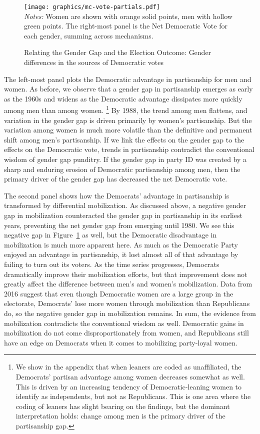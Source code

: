 \documentclass[12pt
               ,final
               ]{article}
\newcommand{\notes}[1]{\\
\small
\emph{Notes:} #1}
\begin{document}
  \begin{figure}
   \centering
   \caption{Relating the Gender Gap and the Election Outcome: Gender differences in the sources of Democratic votes}
   \label{fig:partials-on-vote}
   \texttt{[image: graphics/mc-vote-partials.pdf]}
   \notes{Women are shown with orange solid points, men with hollow green points.  The right-most panel is the Net Democratic Vote for each gender, summing across mechanisms.}
  \end{figure}

The left-most panel plots the Democratic advantage in partisanship for men and women. As before, we observe that a gender gap in partisanship emerges as early as the 1960s and widens as the Democratic advantage dissipates more quickly among men than among women.%
  \footnote{We show in the appendix that when leaners are coded as unaffiliated, the Democrats' partisan advantage among women decreases somewhat as well. This is driven by an increasing tendency of Democratic-leaning women to identify as independents, but not as Republicans. This is one area where the coding of leaners has slight bearing on the findings, but the dominant interpretation holds: change among men is the primary driver of the partisanship gap.}
By 1988, the trend among men flattens, and variation in the gender gap is driven primarily by women's partisanship. But the variation among women is much more volatile than the definitive and permanent shift among men's partisanship. If we link the effects on the gender gap to the effects on the Democratic vote, trends in partisanship contradict the conventional wisdom of gender gap punditry. If the gender gap in party ID was created by a sharp and enduring erosion of Democratic partisanship among men, then the primary driver of the gender gap has decreased the net Democratic vote.

The second panel shows how the Democrats' advantage in partisanship is transformed by differential mobilization. As discussed above, a negative gender gap in mobilization counteracted the gender gap in partisanship in its earliest years, preventing the net gender gap from emerging until 1980. We see this negative gap in Figure~\ref{fig:partials-on-vote} as well, but the Democratic disadvantage in mobilization is much more apparent here. As much as the Democratic Party enjoyed an advantage in partisanship, it lost almost all of that advantage by failing to turn out its voters. As the time series progresses, Democrats dramatically improve their mobilization efforts, but that improvement does not greatly affect the difference between men's and women's mobilization. Data from 2016 suggest that even though Democratic women are a large group in the electorate, Democrats' lose more women through mobilization than Republicans do, so the negative gender gap in mobilization remains. In sum, the evidence from mobilization contradicts the conventional wisdom as well. Democratic gains in mobilization do not come disproportionately from women, and Republicans still have an edge on Democrats when it comes to mobilizing party-loyal women.
\end{document}
